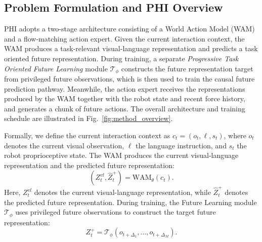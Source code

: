 \documentclass{article} %
\begin{document}

\subsection{Problem Formulation and PHI Overview}
PHI adopts a two-stage architecture consisting of a World Action Model (WAM)
and a flow-matching action expert. Given the current interaction context, the
WAM produces a task-relevant visual-language representation and predicts a
task oriented future representation. During training, a separate
\emph{Progressive Task Oriented Future Learning} module $\mathcal{T}_{\phi}$ constructs the
future representation target from privileged future observations, which is
then used to train the causal future prediction pathway. Meanwhile, the
action expert receives the representations produced by the WAM together
with the robot state and recent force history, and generates a chunk of
future actions. The overall architecture and training schedule are
illustrated in Fig.~\ref{fig:method_overview}.

Formally, we define the current interaction context as
$c_t=(o_t,\ell,s_t)$, where $o_t$ denotes the current visual observation,
$\ell$ the language instruction, and $s_t$ the robot proprioceptive state.
The WAM produces the current visual-language representation and the predicted
future representation:
\begin{equation}
    \left(
        Z_t^{vl},\hat{Z}_t^{+}
    \right)
    =
    \mathrm{WAM}_{\theta}(c_t).
\end{equation}
Here, $Z_t^{vl}$ denotes the current visual-language representation, while
$\hat{Z}_t^{+}$ denotes the predicted future representation. During training,
the Future Learning module
$\mathcal{T}_{\phi}$ uses privileged future observations to construct the
target future representation:
\begin{equation}
    Z_t^{+}
    =
    \mathcal{T}_{\phi}
    \left(
        o_{t+\Delta_1},\ldots,o_{t+\Delta_M}
    \right).
\end{equation}
\end{document}
